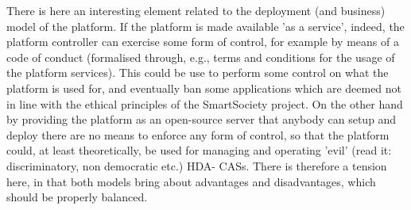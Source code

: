 There is here an interesting element related to the deployment (and business) model of the platform. If the platform is made available 'as a service', indeed, the platform controller can exercise some form of control, for example by means of a code of conduct (formalised through, e.g., terms and conditions for the usage of the platform services). This could be use to perform some control on what the platform is used for, and eventually ban some applications which are deemed not in line with the ethical principles of the SmartSociety project. On the other hand by providing the platform as an open-source server that anybody can setup and deploy there are no means to enforce any form of control, so that the platform could, at least theoretically, be used for managing and operating 'evil' (read it: discriminatory, non democratic etc.) HDA- CASs. There is therefore a tension here, in that both models bring about advantages and disadvantages, which should be properly balanced. 


